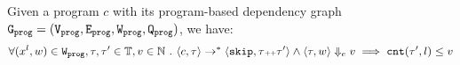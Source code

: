 
{
  \begin{thm}
    \label{thm:addweight_soundness}
  Given a program ${c}$ with its program-based dependency graph 
  $\mathtt{{G_{prog}}} = (\mathtt{{V_{prog}}}, \mathtt{{E_{prog}}}, \mathtt{{W_{prog}}}, \mathtt{{Q_{prog}}})$,
  we have:
  \[
  \forall (x^l, w) \in \mathtt{{W_{prog}}}, \mathtt{\tau}, \mathtt{\tau}' \in \mathbb{T},
  v \in \mathbb{N}
   ~.~ 
  \langle {c}, \mathtt{\tau} \rangle \to^{*} \langle \mathtt{skip}, \mathtt{\tau}{\scriptscriptstyle ++}\mathtt{\tau}' \rangle 
  \land 
  \langle \mathtt{\tau}, w \rangle \Downarrow_e v
  \implies
  \mathtt{cnt}(\mathtt{\tau}', l) \leq v
  \]
  \end{thm}
  }
